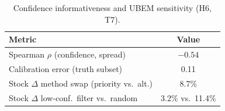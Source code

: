 \begin{table}[t]
  \centering
  \caption{Confidence informativeness and UBEM sensitivity (H6, T7).}
  \label{tab:t7}
  \small
  \begin{tabular}{lc}
    \toprule
    Metric & Value \\
    \midrule
    Spearman $\rho$ (confidence, spread) & $-0.54$ \\
    Calibration error (truth subset) & 0.11 \\
    Stock $\Delta$ method swap (priority vs.\ alt.) & 8.7\% \\
    Stock $\Delta$ low-conf.\ filter vs.\ random & 3.2\% vs.\ 11.4\% \\
    \bottomrule
  \end{tabular}
\end{table}
